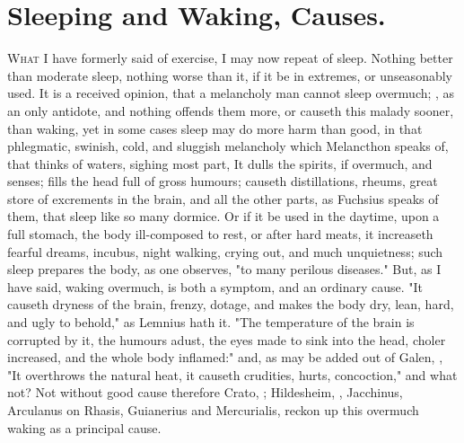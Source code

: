 \section{Sleeping and Waking, Causes.}

\lettrine{W}{hat} I have formerly said of exercise, I may now repeat of sleep.
Nothing better than moderate sleep, nothing worse than it, if it be in
extremes, or unseasonably used. It is a received opinion, that a melancholy man
cannot sleep overmuch; , as an only antidote,
and nothing offends them more, or causeth this malady sooner, than waking, yet
in some cases sleep may do more harm than good, in that phlegmatic, swinish,
cold, and sluggish melancholy which Melancthon speaks of, that thinks of
waters, sighing most part, \etc{} It dulls the spirits, if
overmuch, and senses; fills the head full of gross humours; causeth
distillations, rheums, great store of excrements in the brain, and all the
other parts, as Fuchsius speaks of them, that sleep like
so many dormice. Or if it be used in the daytime, upon a full stomach, the body
ill-composed to rest, or after hard meats, it increaseth fearful dreams,
incubus, night walking, crying out, and much unquietness; such sleep prepares
the body, as one observes, "to many perilous diseases."
But, as I have said, waking overmuch, is both a symptom, and an ordinary cause.
"It causeth dryness of the brain, frenzy, dotage, and makes the body dry, lean,
hard, and ugly to behold," as Lemnius hath it. "The
temperature of the brain is corrupted by it, the humours adust, the eyes made
to sink into the head, choler increased, and the whole body inflamed:" and, as
may be added out of Galen, ,
\Avicenna{}  "It overthrows the
natural heat, it causeth crudities, hurts, concoction," and what not? Not
without good cause therefore Crato, ;
Hildesheim, , Jacchinus,
Arculanus on Rhasis, Guianerius and Mercurialis, reckon up this overmuch waking
as a principal cause.


